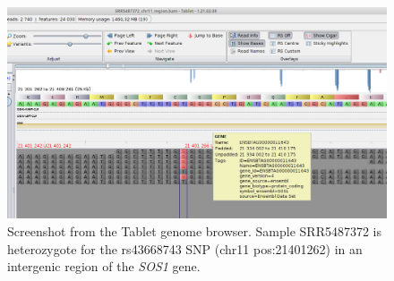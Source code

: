 \begin{figure}
\begin{center}

\includegraphics[width=1\textwidth]{misc/chr11_region.png}
\caption[caption] {Screenshot from the Tablet genome browser. Sample SRR5487372 is heterozygote for the rs43668743 SNP (chr11 pos:21401262) in an intergenic region of the \textit{SOS1} gene.}

\end{center}
\end{figure}


